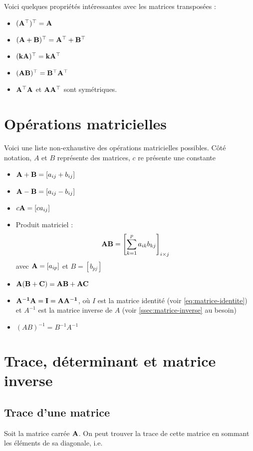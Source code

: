 Voici quelques propriétés intéressantes avec les matrices transposées : 
\begin{itemize}
  \item $\mathbf{(A^\top)^\top = A}$
  \item $\mathbf{(A+B)^\top = A^\top + B^\top}$
  \item $\mathbf{(kA)^\top = kA^\top}$
  \item $\mathbf{(AB)^\top = B^\top A^\top}$
  \item $\mathbf{A^\top A}$ et $\mathbf{A A^\top}$ sont symétriques.
\end{itemize}

\section{Opérations matricielles} Voici une liste non-exhaustive des opérations matricielles possibles. Côté notation, $A$ et $B$ représente des matrices, $c$ re présente une constante
\begin{itemize}
\item $\mathbf{A + B}  = [a_{ij} + b_{ij}]$
\item $\mathbf{A - B}  = [a_{ij} - b_{ij}]$
\item $c\mathbf{A}   = [ca_{ij}]$
\item Produit matriciel :
\begin{equation}
\label{eq:produit-matriciel}
\mathbf{AB}   = \left[ \sum_{k=1}^p a_{ik} b_{kj}  \right]_{i \times j}
\end{equation}
avec $\mathbf{A}=[a_{ip}]$ et $B = [b_{pj}]$
\item $\mathbf{A(B +C) = AB + AC}$
\item $\mathbf{A^{-1} A = I =A A^{-1}}$, où $I$ est la matrice identité (voir \autoref{eq:matrice-identite}) et $A^{-1}$ est la matrice inverse de $A$ (voir \autoref{ssec:matrice-inverse} au besoin)
\item $(AB)^{-1} = B^{-1} A^{-1}$
\end{itemize}






\section{Trace, déterminant et matrice inverse}
\subsection{Trace d'une matrice}
\label{ssec:trace-matrice}
Soit la matrice carrée $\mathbf{A}$. On peut trouver la trace de cette matrice en sommant les éléments de sa diagonale, i.e.

